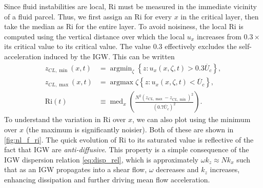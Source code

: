 \documentclass[
        fleqn,
        usenatbib,
    ]{mnras}
\newcommand*{\p}[1]{\left(#1\right)}
\newcommand*{\z}[1]{\left\{#1\right\}}
\DeclareMathOperator*{\argmin}{argmin}
\DeclareMathOperator*{\argmax}{argmax}
\DeclareMathOperator*{\med}{med}
\begin{document}
Since fluid instabilities are local, $\mathrm{Ri}$ must be measured in the
immediate vicinity of a fluid parcel. Thus, we first assign an $\mathrm{Ri}$ for
every $x$ in the critical layer, then take the median as $\mathrm{Ri}$ for the
entire layer. To avoid noisiness, the local $\mathrm{Ri}$ is computed using the
vertical distance over which the local $u_x$ increases from $0.3 \times$ its
critical value to its critical value. The value $0.3$ effectively excludes the
self-acceleration induced by the IGW\@. This can be written
\begin{align}
    z_{CL, \min}(x, t) &= \argmin_\zeta
        \z{z: u_x(x, \zeta, t) > 0.3\overline{U}_c},\nonumber\\
    z_{CL, \max}(x, t) &= \argmax
        \zeta \z{z: u_x(x, \zeta, t) < \overline{U}_c},\nonumber\\
    \mathrm{Ri}(t) &\equiv
        \med_x\p{\frac{N^2 \p{z_{CL, \max} - z_{CL, \min}}^2}{(0.7
            \overline{U}_c)^2}}.\label{ss:ri_med_def}
\end{align}
To understand the variation in $\mathrm{Ri}$ over $x$, we can also plot using
the minimum over $x$ (the maximum is significantly noisier). Both of these are
shown in \autoref{fig:nl_f_ri}. The quick evolution of $\mathrm{Ri}$ to its
saturated value is reflective of the fact that IGW are \emph{anti-diffusive}.
This property is a simple consequence of the IGW dispersion relation
\autoref{eq:disp_rel}, which is approximately $\omega k_z \approx Nk_x$ such
that as an IGW propagates into a shear flow, $\omega$ decreases and $k_z$
increases, enhancing dissipation and further driving mean flow acceleration.
\end{document}
